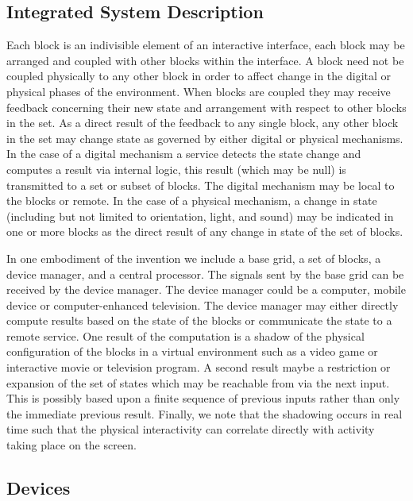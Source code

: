 \documentclass[]{article}
\begin{document}
\subsection{Integrated System Description}
Each block is an indivisible element of an interactive interface, each block may be arranged and coupled with other blocks within the interface. A block need not be coupled physically to any other block in order to affect change in the digital or physical phases of the environment. When blocks are coupled they may receive feedback concerning their new state and arrangement with respect to other blocks in the set. As a direct result of the feedback to any single block, any other block in the set may change state as governed by either digital or physical mechanisms. In the case of a digital mechanism a service detects the state change and computes a result via internal logic, this result (which may be null) is transmitted to a set or subset of blocks. The digital mechanism may be local to the blocks or remote. In the case of a physical mechanism, a change in state (including but not limited to orientation, light, and sound) may be indicated in one or more blocks as the direct result of any change in state of the set of blocks.

In one embodiment of the invention we include a base grid, a set of blocks, a device manager, and a central processor. The signals sent by the base grid can be received by the device manager. The device manager could be a computer, mobile device or computer-enhanced television. The device manager may either directly compute results based on the state of the blocks or communicate the state to a remote service. One result of the computation is a shadow of the physical configuration of the blocks in a virtual environment such as a video game or interactive movie or television program. A second result maybe a restriction or expansion of the set of states which may be reachable from via the next input. This is possibly based upon a finite sequence of previous inputs rather than only the immediate previous result. Finally, we note that the shadowing occurs in real time such that the physical interactivity can correlate directly with activity taking place on the screen.
\subsection{Devices}
\end{document}
